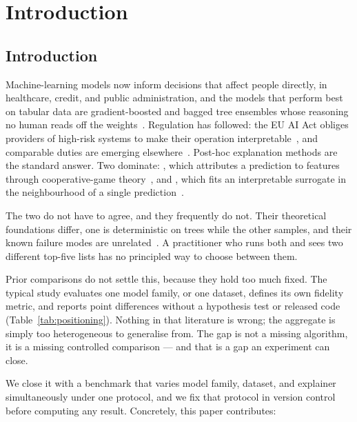 \chapter{Introduction}\label{ch:intro}

\section{Introduction}\label{sec:intro}

Machine-learning models now inform decisions that affect people directly, in
healthcare, credit, and public administration, and the models that perform best on
tabular data are gradient-boosted and bagged tree ensembles whose reasoning no human
reads off the weights~\cite{grinsztajn2022why}. Regulation has followed: the EU AI Act
obliges providers of high-risk systems to make their operation
interpretable~\cite{euaiact2024}, and comparable duties are emerging
elsewhere~\cite{goodman2017european}. Post-hoc explanation methods are the standard
answer. Two dominate: \shap{}, which attributes a prediction to features through
cooperative-game theory~\cite{lundberg2017unified,lundberg2020local}, and \lime{},
which fits an interpretable surrogate in the neighbourhood of a single
prediction~\cite{ribeiro2016why}.

The two do not have to agree, and they frequently do not. Their theoretical
foundations differ, one is deterministic on trees while the other samples, and their
known failure modes are unrelated~\cite{slack2020fooling,kumar2020problems}. A
practitioner who runs both and sees two different top-five lists has no principled
way to choose between them.

Prior comparisons do not settle this, because they hold too much fixed. The typical
study evaluates one model family, or one dataset, defines its own fidelity metric,
and reports point differences without a hypothesis test or released code
(Table~\ref{tab:positioning}). Nothing in that literature is wrong; the aggregate is
simply too heterogeneous to generalise from. The gap is not a missing algorithm, it
is a missing controlled comparison --- and that is a gap an experiment can close.

We close it with a benchmark that varies model family, dataset, and explainer
simultaneously under one protocol, and we fix that protocol in version control before
computing any result. Concretely, this paper contributes:

